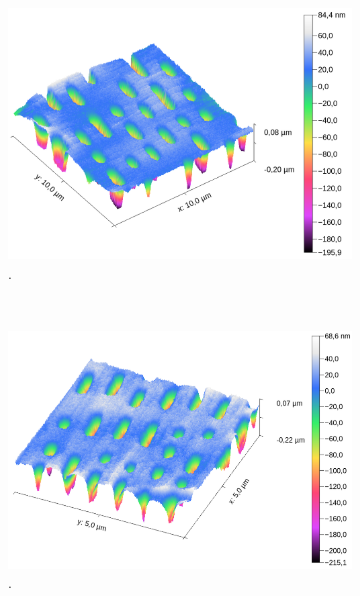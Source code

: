 \begin{figure}[H]
\centering
	\begin{subfigure}[t]{0.45\textwidth}
	\includegraphics[width=\textwidth]{AFM_auswertung/cd_3D.png}
	\caption{.}
	\label{abb:cd_3d}
	\end{subfigure}
	~
	\begin{subfigure}[t]{0.45\textwidth}
	\includegraphics[width=\textwidth]{AFM_auswertung/dvd_3d.png}
	\caption{.}
	\label{abb:dvd_3d}
	\end{subfigure}
	\\
	\begin{subfigure}[t]{0.45\textwidth}

\end{subfigure}
\end{figure}
